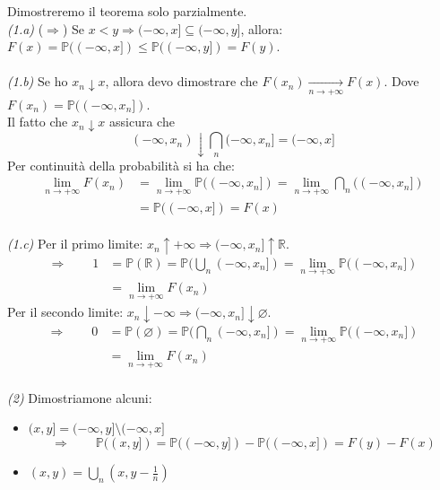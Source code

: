     \begin{dimostrazione} Dimostreremo il teorema solo parzialmente.\\
        \textit{(1.a)} ($\Rightarrow$) Se $x<y \Rightarrow (-\infty, x] \subseteq(-\infty, y]$, allora:
        $F(x) = \mathbb{P}((-\infty, x]) \leq \mathbb{P}((-\infty, y]) = F(y)$.\\
        \\
        \textit{(1.b)} Se ho $x_n\downarrow x$, allora devo dimostrare che $F(x_n)\underset{n\to+\infty}{\longrightarrow} F(x)$. Dove $F(x_n) = \mathbb{P}((-\infty, x_n])$.\\
        Il fatto che $x_n\downarrow x$ assicura che \[(-\infty, x_n)\downarrow\bigcap_n(-\infty, x_n] = (-\infty, x]\]
        Per continuità della probabilità si ha che:
        \begin{align*}
            \lim_{n\to +\infty}F(x_n) &= \lim_{n\to +\infty}\mathbb{P}((-\infty, x_n]) = \lim_{n\to +\infty}\bigcap_n((-\infty, x_n])\\
            &=\mathbb{P}((-\infty, x]) = F(x)
        \end{align*}
        \\
        \textit{(1.c)} Per il primo limite: $x_n\uparrow+\infty\Rightarrow(-\infty, x_n]\uparrow\mathbb{R}$.
        \begin{align*}
            \Rightarrow\qquad 1 &= \mathbb{P}(\mathbb{R}) = \mathbb{P}(\bigcup_n(-\infty, x_n])= \lim_{n\to+\infty} \mathbb{P}((-\infty, x_n])\\
            &= \lim_{n\to+\infty}F(x_n)
        \end{align*}
        Per il secondo limite: $x_n\downarrow-\infty\Rightarrow(-\infty, x_n]\downarrow\varnothing$.
        \begin{align*}
            \Rightarrow\qquad 0 &= \mathbb{P}(\varnothing) = \mathbb{P}(\bigcap_n(-\infty, x_n])= \lim_{n\to+\infty} \mathbb{P}((-\infty, x_n])\\
            &= \lim_{n\to+\infty}F(x_n)
        \end{align*}\\
        \textit{(2)} Dimostriamone alcuni:
        \begin{itemize}
            \item $(x, y] = (-\infty, y]\setminus(-\infty, x]$
            \[\Rightarrow\qquad\mathbb{P}((x,y]) = \mathbb{P}((-\infty, y]) - \mathbb{P}((-\infty, x]) = F(y) - F(x)\]
            \item $(x, y) = \bigcup_{n}\left(x, y-\frac{1}{n}\right)$

\end{itemize}
\end{dimostrazione}
